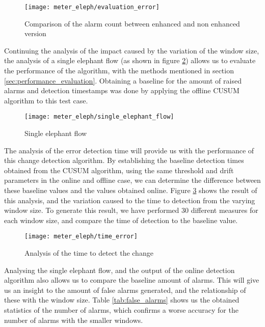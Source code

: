 \begin{figure}[H]
    \centering
    \texttt{[image: meter\_eleph/evaluation\_error]}
    \caption {Comparison of the alarm count between enhanced and non enhanced version}
    \label{fig:errors_comparaison}
\end{figure} 

\par Continuing the analysis of the impact caused by the variation of the window size, the analysis of a single elephant flow (as shown in figure 
\ref{fig:single_elephant}) allows us to evaluate the performance of the algorithm, with the methods mentioned in section \ref{sec:performance_evaluation}. Obtaining
a baseline for the amount of raised alarms and detection timestamps was done by applying the offline CUSUM algorithm to this test case.

\begin{figure}[H]
    \centering
    \texttt{[image: meter\_eleph/single\_elephant\_flow]}
    \caption{Single elephant flow}
    \label{fig:single_elephant}
\end{figure} 

\par The analysis of the error detection time will provide us with the performance of this change detection algorithm. By establishing the baseline detection times
obtained from the CUSUM algorithm, using the same threshold and drift parameters in the online and offline case, we can determine the difference between these
baseline values and the values obtained online. Figure \ref{fig:time_error} shows the result of this analysis, and the variation caused to the time to detection
from the varying window size. To generate this result, we have performed 30 different measures for each window size, and compare the time of detection to the baseline
value. 

\begin{figure}[H]
    \centering
    \texttt{[image: meter\_eleph/time\_error]}
    \caption{Analysis of the time to detect the change}
    \label{fig:time_error}
\end{figure} 

\par Analysing the single elephant flow, and the output of the online detection algorithm also allows us to compare the baseline amount of alarms. This will give 
us an insight to the amount of false alarms generated, and the relationship of these with the window size. Table \ref{tab:false_alarms} shows us the obtained
statistics of the number of alarms, which confirms a worse accuracy for the number of alarms with the smaller windows.

